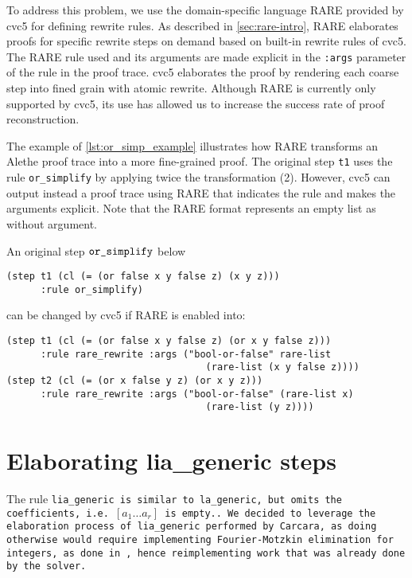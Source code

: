 To address this problem, we use the domain-specific language RARE \cite{rare} provided by cvc5 for defining rewrite rules. As described in \cref{sec:rare-intro}, RARE elaborates proofs for specific rewrite steps on demand based on built-in rewrite rules of cvc5.
The RARE rule used and its arguments are made explicit in the \lstinline[language=SMT]{:args} parameter of the rule  in the proof trace.
cvc5 elaborates the proof by rendering each coarse step into fined grain with atomic rewrite.
Although RARE is currently only supported by cvc5, its use has allowed us to increase the success rate of proof reconstruction.

The example of \cref{lst:or_simp_example} illustrates how RARE transforms an Alethe proof trace into a more fine-grained proof.
The original step \texttt{t1} uses the rule \texttt{or\_simplify} by applying twice the transformation (2).
However, cvc5 can output instead a proof trace using RARE that indicates the rule  and makes the arguments explicit.
Note that the RARE format represents an empty list as  without argument.

\begin{example} An original step $\texttt{\upshape{or\_simplify}}$ below
\begin{lstlisting}[language=SMT]
(step t1 (cl (= (or false x y false z) (x y z)))
      :rule or_simplify)
\end{lstlisting}

can be changed by cvc5 if RARE is enabled into:

\begin{lstlisting}[language=SMT,caption={\texttt{or\_simplify} elaborated by RARE}, label={lst:or_simp_example}]
(step t1 (cl (= (or false x y false z) (or x y false z)))
      :rule rare_rewrite :args ("bool-or-false" rare-list
                                   (rare-list (x y false z))))
(step t2 (cl (= (or x false y z) (or x y z)))
      :rule rare_rewrite :args ("bool-or-false" (rare-list x)
                                   (rare-list (y z))))
\end{lstlisting}
\end{example}


\section{Elaborating lia\_generic steps}
\label{sec:elaboration-lia}

The rule \tt{lia\_generic} is similar to \tt{la\_generic}, but omits the coefficients,
i.e.\ \colorbox{orange!30}{$[a_1 \dots a_r]$} is empty..
We decided to leverage the elaboration process of \tt{lia\_generic} performed by Carcara, as doing otherwise would require implementing Fourier-Motzkin elimination for integers, as done in \cite{micromega,omegatest}, hence reimplementing work that was already done by the solver.

